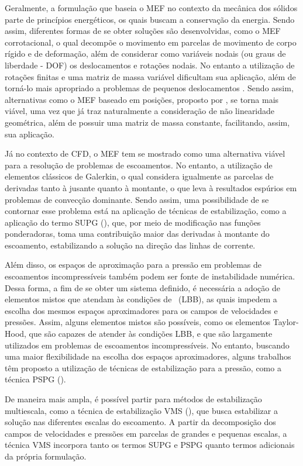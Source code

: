 Geralmente, a formulação que baseia o MEF no contexto da mecânica dos sólidos parte de princípios energéticos, os quais buscam a conservação da energia. Sendo assim, diferentes formas de se obter soluções são desenvolvidas, como o MEF corrotacional, o qual decompõe o movimento em parcelas de movimento de corpo rígido e de deformação, além de considerar como variáveis nodais (ou graus de liberdade - DOF) os deslocamentos e rotações nodais. No entanto a utilização de rotações finitas e uma matriz de massa variável dificultam sua aplicação, além de torná-lo mais apropriado a problemas de pequenos deslocamentos \cite{sanches2013unconstrained}. Sendo assim, alternativas como o MEF baseado em posições, proposto por , se torna mais viável, uma vez que já traz naturalmente a consideração de não linearidade geométrica, além de possuir uma matriz de massa constante, facilitando, assim, sua aplicação.

Já no contexto de CFD, o MEF tem se mostrado como uma alternativa viável para a resolução de problemas de escoamentos. No entanto, a utilização de elementos clássicos de Galerkin, o qual considera igualmente as parcelas de derivadas tanto à jusante quanto à montante, o que leva à resultados espúrios em problemas de convecção dominante. Sendo assim, uma possibilidade de se contornar esse problema está na aplicação de técnicas de estabilização, como a aplicação do termo SUPG (\SUPG), que, por meio de modificação nas funções ponderadoras, toma uma contribuição maior das derivadas à montante do escoamento, estabilizando a solução na direção das linhas de corrente.

Além disso, os espaços de aproximação para a pressão em problemas de escoamentos incompressíveis também podem ser fonte de instabilidade numérica. Dessa forma, a fim de se obter um sistema definido, é necessária a adoção de elementos mistos que atendam às condições de \LBB\ (LBB), as quais impedem a escolha dos mesmos espaços aproximadores para os campos de velocidades e pressões. Assim, alguns elementos mistos são possíveis, como os elementos Taylor-Hood, que são capazes de atender às condições LBB, e que são largamente utilizados em problemas de escoamentos incompressíveis. No entanto, buscando uma maior flexibilidade na escolha dos espaços aproximadores, alguns trabalhos têm proposto a utilização de técnicas de estabilização para a pressão, como a técnica PSPG (\PSPG).

De maneira mais ampla, é possível partir para métodos de estabilização multiescala, como a técnica de estabilização VMS (\VMS), que busca estabilizar a solução nas diferentes escalas do escoamento. A partir da decomposição dos campos de velocidades e pressões em parcelas de grandes e pequenas escalas, a técnica VMS incorpora tanto os termos SUPG e PSPG quanto termos adicionais da própria formulação.

